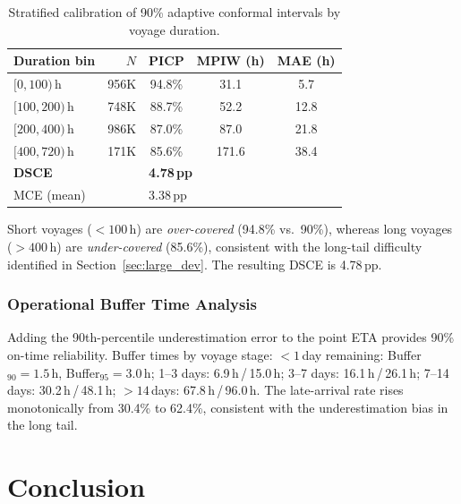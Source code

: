 \documentclass[sigconf,anonymous]{acmart}%
\begin{document}
\begin{table}[t]
    \centering
    \caption{Stratified calibration of 90\% adaptive conformal intervals by voyage duration.}
    \label{tab:stratified_calib}
    \begin{tabular}{lrccc}
        \toprule
        \textbf{Duration bin} & \textbf{$N$} & \textbf{PICP} & \textbf{MPIW (h)} & \textbf{MAE (h)} \\
        \midrule
        $[0, 100)$\,h   & 956K  & 94.8\% & 31.1  & 5.7  \\
        $[100, 200)$\,h  & 748K  & 88.7\% & 52.2  & 12.8 \\
        $[200, 400)$\,h  & 986K  & 87.0\% & 87.0  & 21.8 \\
        $[400, 720)$\,h  & 171K  & 85.6\% & 171.6 & 38.4 \\
        \midrule
        \multicolumn{2}{l}{\textbf{DSCE}} & \multicolumn{3}{l}{\textbf{4.78\,pp}} \\
        \multicolumn{2}{l}{MCE (mean)} & \multicolumn{3}{l}{3.38\,pp} \\
        \bottomrule
    \end{tabular}
\end{table}

\noindent Short voyages ($< 100$\,h) are \textit{over-covered} (94.8\% vs.\ 90\%), whereas long voyages ($> 400$\,h) are \textit{under-covered} (85.6\%), consistent with the long-tail difficulty identified in Section~\ref{sec:large_dev}. The resulting DSCE is 4.78\,pp.

\subsubsection{Operational Buffer Time Analysis}

Adding the 90th-percentile underestimation error to the point ETA provides 90\% on-time reliability. Buffer times by voyage stage: $<1$\,day remaining: Buffer$_{90}{=}1.5$\,h, Buffer$_{95}{=}3.0$\,h; 1--3 days: 6.9\,h\,/\,15.0\,h; 3--7 days: 16.1\,h\,/\,26.1\,h; 7--14 days: 30.2\,h\,/\,48.1\,h; $>14$\,days: 67.8\,h\,/\,96.0\,h. The late-arrival rate rises monotonically from 30.4\% to 62.4\%, consistent with the underestimation bias in the long tail.


\section{Conclusion}
\end{document}

